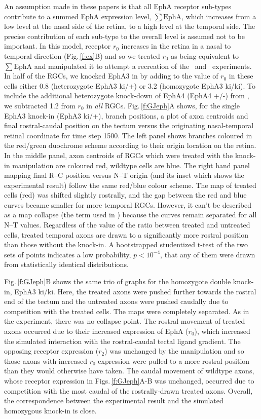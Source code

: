 \documentclass[9pt]{elife} %
\begin{document}
An assumption made in these papers is that all EphA receptor sub-types contribute to a summed EphA expression level, $\sum\mathrm{EphA}$, which increases from a low level at the nasal side of the retina, to a high level at the temporal side.
The precise contribution of each sub-type to the overall level is assumed not to be important.
In this model, receptor $r_0$ increases in the retina in a nasal to temporal direction (Fig.\,\ref{f:ex}B) and so we treated $r_0$ as being equivalent to $\sum\mathrm{EphA}$ and manipulated it to attempt a recreation of the \citet{brown_topographic_2000}~and \citet{reber_relative_2004}~experiments.
In half of the RGCs, we knocked EphA3 in by adding to the value of $r_0$ in these cells either 0.8 (heterozygote EphA3 ki/+) or 3.2 (homozygote EphA3 ki/ki).
To include the additional heterozygote knock-down of EphA4 (EphA4 +/-) from \citet{reber_relative_2004}, we subtracted 1.2 from $r_0$ in \emph{all} RGCs.
Fig.\,\ref{f:GJeph}A shows, for the single EphA3 knock-in (EphA3 ki/+), branch positions, a plot of axon centroids and final rostral-caudal position on the tectum versus the originating nasal-temporal retinal coordinate for time step 1500.
The left panel shows branches coloured in the red/green duochrome scheme according to their origin location on the retina.
In the middle panel, axon centroids of RGCs which were treated with the knock-in manipulation are coloured red, wildtype cells are blue.
The right hand panel mapping final R--C position versus N--T origin  (and its inset which shows the experimental result) follow the same red/blue colour scheme.
The map of treated cells (red) was shifted slightly rostrally, and the gap between the red and blue curves became smaller for more temporal RGCs. However, it can't be described as a map collapse (the term used in \citet{brown_topographic_2000}) because the curves remain separated for all N--T values. Regardless of the value of the ratio between treated and untreated cells, treated temporal axons are drawn to a significantly more rostral position than those without the knock-in. A bootstrapped studentized t-test of the two sets of points indicates a low probability, $p<10^{-4}$, that any of them were drawn from statistically identical distributions.

Fig.\,\ref{f:GJeph}B shows the same trio of graphs for the homozygote double knock-in, EphA3 ki/ki. Here, the treated axons were pushed further towards the rostral end of the tectum and the untreated axons were pushed caudally due to competition with the treated cells.
The maps were completely separated. As in the experiment, there was no collapse point.
The rostral movement of treated axons occurred due to their increased expression of EphA ($r_0$), which increased the simulated interaction with the rostral-caudal tectal ligand gradient.
The opposing receptor expression ($r_2$) was unchanged by the manipulation and so those axons with increased $r_0$ expression were pulled to a more rostral position than they would otherwise have taken.
The caudal movement of wildtype axons, whose receptor expression in Figs.\,\ref{f:GJeph}A-B was unchanged, occurred due to competition with the most caudal of the rostrally-drawn treated axons.
Overall, the correspondence between the experimental result and the simulated homozygous knock-in is close.
\end{document}
